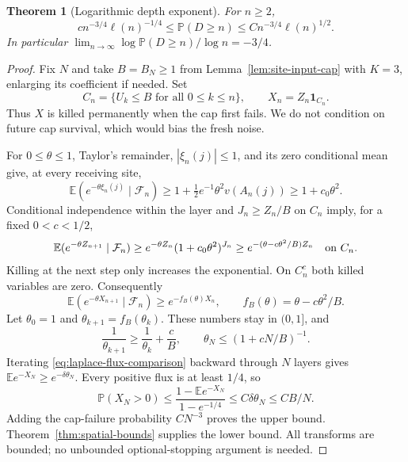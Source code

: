 \documentclass[11pt]{article}
\numberwithin{equation}{section}
\newtheorem{theorem}{Theorem}[section]
\theoremstyle{definition}
\newcommand{\E}{\mathbb E}
\newcommand{\Prob}{\mathbb P}
\newcommand{\ind}{\mathbf 1}
\begin{document}
\begin{theorem}[Logarithmic depth exponent]\label{thm:depth-exponent}
For $n\ge2$,
\begin{equation}\label{eq:sharp-depth-logs}
 c n^{-3/4}\ell(n)^{-1/4}
 \le\Prob(D\ge n)\le C n^{-3/4}\ell(n)^{1/2}.
\end{equation}
In particular $\lim_{n\to\infty}\log\Prob(D\ge n)/\log n=-3/4$.
\end{theorem}
\begin{proof}
Fix $N$ and take $B=B_N\ge1$ from Lemma~\ref{lem:site-input-cap} with $K=3$, enlarging its coefficient if needed. Set
\[
 C_n=\{U_k\le B\text{ for all }0\le k\le n\},\qquad
 X_n=Z_n\ind_{C_n}.
\]
Thus $X$ is killed permanently when the cap first fails. We do not condition on future cap survival, which would bias the fresh noise.

For $0\le\theta\le1$, Taylor's remainder, $|\xi_n(j)|\le1$, and its zero conditional mean give, at every receiving site,
\[
 \E(e^{-\theta\xi_n(j)}\mid\mathcal F_n)
 \ge1+\tfrac12 e^{-1}\theta^2v(A_n(j))
 \ge1+c_0\theta^2.
\]
Conditional independence within the layer and $J_n\ge Z_n/B$ on $C_n$ imply, for a fixed $0<c<1/2$,
\[
 \E(e^{-\theta Z_{n+1}}\mid\mathcal F_n)
 \ge e^{-\theta Z_n}(1+c_0\theta^2)^{J_n}
 \ge e^{-(\theta-c\theta^2/B)Z_n}\quad\hbox{on }C_n.
\]
Killing at the next step only increases the exponential. On $C_n^c$ both killed variables are zero. Consequently
\begin{equation}\label{eq:laplace-flux-comparison}
 \E(e^{-\theta X_{n+1}}\mid\mathcal F_n)
 \ge e^{-f_B(\theta)X_n},\qquad
 f_B(\theta)=\theta-c\theta^2/B.
\end{equation}
Let $\theta_0=1$ and $\theta_{k+1}=f_B(\theta_k)$. These numbers stay in $(0,1]$, and
\[
 \frac1{\theta_{k+1}}\ge\frac1{\theta_k}+\frac cB,
 \qquad \theta_N\le(1+cN/B)^{-1}.
\]
Iterating \eqref{eq:laplace-flux-comparison} backward through $N$ layers gives $\E e^{-X_N}\ge e^{-\delta\theta_N}$. Every positive flux is at least $1/4$, so
\[
 \Prob(X_N>0)\le\frac{1-\E e^{-X_N}}{1-e^{-1/4}}
 \le C\delta\theta_N\le CB/N.
\]
Adding the cap-failure probability $C N^{-3}$ proves the upper bound. Theorem~\ref{thm:spatial-bounds} supplies the lower bound. All transforms are bounded; no unbounded optional-stopping argument is needed.
\end{proof}
\end{document}
